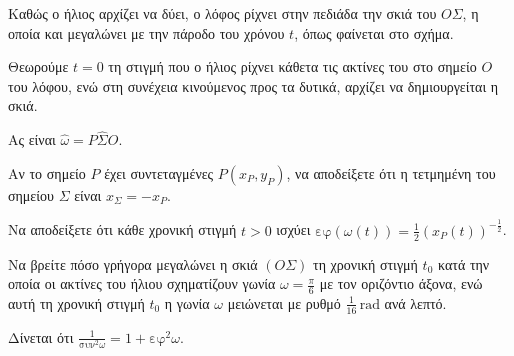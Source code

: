 Καθώς ο ήλιος αρχίζει να δύει, ο λόφος ρίχνει στην πεδιάδα την σκιά του $Ο\Sigma$, η οποία και μεγαλώνει με την πάροδο του χρόνου $t$, όπως φαίνεται στο σχήμα.

Θεωρούμε $t = 0$ τη στιγμή που ο ήλιος ρίχνει κάθετα τις ακτίνες του στο σημείο $O$ του λόφου, ενώ στη συνέχεια κινούμενος προς τα δυτικά, αρχίζει να δημιουργείται η σκιά.

Ας είναι $\hat{\omega} = P\widehat{\Sigma}O$.

\begin{alist}
\item Αν το σημείο $P$ έχει συντεταγμένες $P(x_P, y_P)$, να αποδείξετε ότι η τετμημένη του σημείου $\Sigma$ είναι $x_\Sigma = -x_P$. 

\item Να αποδείξετε ότι κάθε χρονική στιγμή $t > 0$ ισχύει $\text{εφ}(\omega(t)) = \frac{1}{2}(x_P(t))^{-\frac{1}{2}}$. 

\item Να βρείτε πόσο γρήγορα μεγαλώνει η σκιά $(Ο\Sigma)$ τη χρονική στιγμή $t_0$ κατά την οποία οι ακτίνες του ήλιου σχηματίζουν γωνία $\omega = \frac{\pi}{6}$ με τον οριζόντιο άξονα, ενώ αυτή τη χρονική στιγμή $t_0$ η γωνία $\omega$ μειώνεται με ρυθμό $\frac{1}{16}\,\text{rad}$ ανά λεπτό. 
\end{alist}
Δίνεται ότι $\frac{1}{\text{συν}^2\omega} = 1 + \text{εφ}^2\omega$.